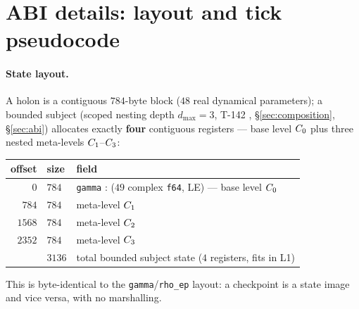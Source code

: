 \section{ABI details: layout and tick pseudocode}
\label{app:abi}

\paragraph{State layout.} A holon is a contiguous $784$-byte block ($48$ real
dynamical parameters); a bounded subject (scoped nesting depth $d_{\max}=3$,
T-142 , \S\ref{sec:composition}, \S\ref{sec:abi}) allocates exactly
\textbf{four} contiguous \DM{} registers --- base level $C_0$ plus three
nested meta-levels $C_1$--$C_3$:
\begin{center}\small
\begin{tabular}{@{}rll@{}}
\toprule
offset & size & field \\
\midrule
$0$    & $784$ & \texttt{gamma} : \DM{} ($49$ complex \texttt{f64}, LE) --- base level $C_0$ \\
$784$  & $784$ & meta-level $C_1$ \DM{} \\
$1568$ & $784$ & meta-level $C_2$ \DM{} \\
$2352$ & $784$ & meta-level $C_3$ \DM{} \\
\midrule
       & $3136$ & total bounded subject state ($4$ registers, fits in L1) \\
\bottomrule
\end{tabular}
\end{center}
This is byte-identical to the \SYNARC{} \texttt{gamma}/\texttt{rho\_ep} layout:
a \SYNARC{} checkpoint is a \TALOS{} state image and vice versa, with no
marshalling.

